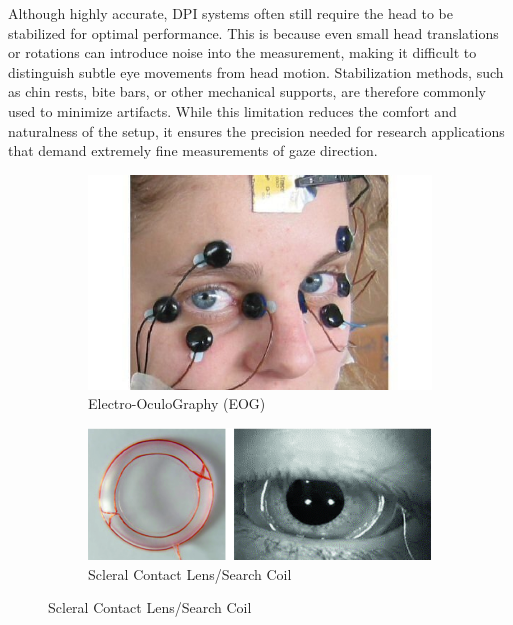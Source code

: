 \documentclass{article}
\begin{document}
Although highly accurate, DPI systems often still require the head to be stabilized for optimal performance. 
This is because even small head translations or rotations can introduce noise into the measurement, making it difficult to distinguish subtle eye movements from head motion. Stabilization methods, such as chin rests, bite bars, or other mechanical supports, are therefore commonly used to minimize artifacts.
While this limitation reduces the comfort and naturalness of the setup, it ensures the precision needed for research applications that demand extremely fine measurements of gaze direction.

\begin{figure}[ht]
    \centering
    \begin{subfigure}[b]{0.45\textwidth}
        \centering
        \includegraphics[width=1\textwidth,height=0.6\textwidth]{Images/Theory/eog.png}
        \caption{Electro-OculoGraphy (EOG)}
        \label{fig:eog}
    \end{subfigure}
    \hfill
    \begin{subfigure}[b]{0.45\textwidth}
        \centering
        \includegraphics[width=1\textwidth,height=0.6\textwidth]{Images/Theory/coil.png}
        \caption{Scleral Contact Lens/Search Coil}
        \label{fig:coil}
    \end{subfigure}
    

\end{figure}
\end{document}
